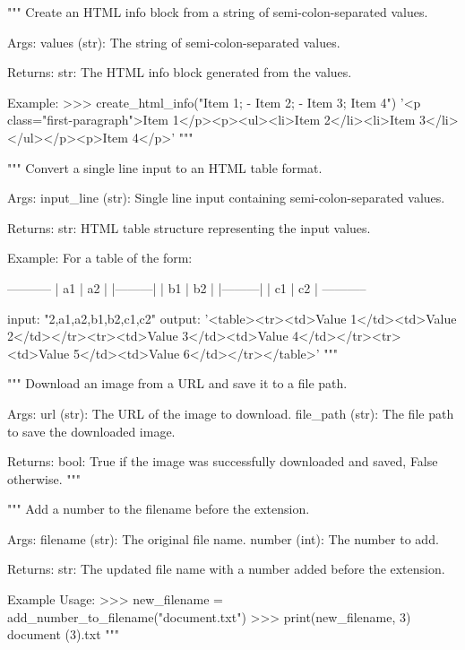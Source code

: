 \begin{codebox}
"""
Create an HTML info block from a string of semi-colon-separated values.

Args:
    values (str): The string of semi-colon-separated values.

Returns:
    str: The HTML info block generated from the values.

Example:
    >>> create_html_info("Item 1; - Item 2; - Item 3; Item 4")
    '<p class="first-paragraph">Item 1</p>\n<p><ul><li>Item 2</li>\n<li>Item 3</li>\n</ul></p>\n<p>Item 4</p>\n'
"""
\end{codebox}

\begin{codebox}
"""
Convert a single line input to an HTML table format.

Args:
    input_line (str): Single line input containing semi-colon-separated values.

Returns:
    str: HTML table structure representing the input values.

Example:
    For a table of the form:

    -----------
    | a1 | a2 |
    |---------|
    | b1 | b2 |
    |---------|
    | c1 | c2 |
    -----------

    input: "2,a1,a2,b1,b2,c1,c2"
    output: '<table><tr><td>Value 1</td><td>Value 2</td></tr><tr><td>Value 3</td><td>Value 4</td></tr><tr><td>Value 5</td><td>Value 6</td></tr></table>'
"""
\end{codebox}

\begin{codebox}
"""
Download an image from a URL and save it to a file path.

Args:
    url (str): The URL of the image to download.
    file_path (str): The file path to save the downloaded image.

Returns:
    bool: True if the image was successfully downloaded and saved, False otherwise.
"""
\end{codebox}

\begin{codebox}
"""
Add a number to the filename before the extension.

Args:
    filename (str): The original file name.
    number (int): The number to add.

Returns:
    str: The updated file name with a number added before the extension.

Example Usage:
    >>> new_filename = add_number_to_filename("document.txt")
    >>> print(new_filename, 3)
    document (3).txt
"""
\end{codebox}

